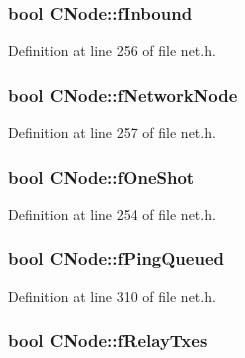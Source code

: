 \subsubsection[{f\+Inbound}]{\setlength{\rightskip}{0pt plus 5cm}bool C\+Node\+::f\+Inbound}\label{class_c_node_a64b2550ec558b6106ebc122d450ad35b}


Definition at line 256 of file net.\+h.

\hypertarget{class_c_node_a933adb2b192939545a01d602b1d7b53a}{}
\subsubsection[{f\+Network\+Node}]{\setlength{\rightskip}{0pt plus 5cm}bool C\+Node\+::f\+Network\+Node}\label{class_c_node_a933adb2b192939545a01d602b1d7b53a}


Definition at line 257 of file net.\+h.

\hypertarget{class_c_node_a2bb91c9968a9f855c05b1121100a8797}{}
\subsubsection[{f\+One\+Shot}]{\setlength{\rightskip}{0pt plus 5cm}bool C\+Node\+::f\+One\+Shot}\label{class_c_node_a2bb91c9968a9f855c05b1121100a8797}


Definition at line 254 of file net.\+h.

\hypertarget{class_c_node_aa1e9c1dc1d5cf806b9be0af155c0bf90}{}
\subsubsection[{f\+Ping\+Queued}]{\setlength{\rightskip}{0pt plus 5cm}bool C\+Node\+::f\+Ping\+Queued}\label{class_c_node_aa1e9c1dc1d5cf806b9be0af155c0bf90}


Definition at line 310 of file net.\+h.

\hypertarget{class_c_node_ab387bb0c4ffd42e3f0aea233dca0e301}{}
\subsubsection[{f\+Relay\+Txes}]{\setlength{\rightskip}{0pt plus 5cm}bool C\+Node\+::f\+Relay\+Txes}\label{class_c_node_ab387bb0c4ffd42e3f0aea233dca0e301}


